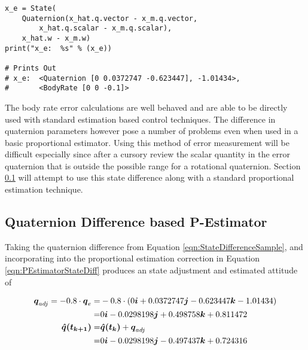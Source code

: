 \begin{singlespace}
  \begin{verbatim}
x_e = State(
    Quaternion(x_hat.q.vector - x_m.q.vector,
        x_hat.q.scalar - x_m.q.scalar),
    x_hat.w - x_m.w)
print("x_e:  %s" % (x_e))

# Prints Out
# x_e:  <Quaternion [0 0.0372747 -0.623447], -1.01434>,
#       <BodyRate [0 0 -0.1]>
  \end{verbatim}
\nocite{minted}
\end{singlespace}


The body rate error calculations are well behaved and are able to be directly used with standard estimation based control techniques.  The difference in quaternion parameters however pose a number of problems even when used in a basic proportional estimator.  Using this method of error measurement will be difficult especially since after a cursory review the scalar quantity in the error quaternion that is outside the possible range for a rotational quaternion.  Section \ref{subsec:QuaternionDifferencebasedPEstimator} will attempt to use this state difference along with a standard proportional estimation technique.

\subsection{Quaternion Difference based P-Estimator}
\label{subsec:QuaternionDifferencebasedPEstimator}

Taking the quaternion difference from Equation \ref{eqn:StateDifferenceSample}, and incorporating into the proportional estimation correction in Equation \ref{eqn:PEstimatorStateDiff} produces an state adjustment and estimated attitude of

\begin{equation}
  \begin{aligned}
    \boldsymbol{q}_{adj} = -0.8 \cdot \boldsymbol{q}_e =& -0.8 \cdot (0 \boldsymbol{i} + 0.0372747 \boldsymbol{j} -0.623447 \boldsymbol{k} -1.01434 ) \\
                       =& 0 \boldsymbol{i} -0.0298198 \boldsymbol{j} +0.498758 \boldsymbol{k} +0.811472 \\
    \boldsymbol{\hat{q}(t_{k+1})} =& \boldsymbol{\hat{q}(t_{k})} + \boldsymbol{q}_{adj} \\
                       =& 0 \boldsymbol{i} -0.0298198 \boldsymbol{j} -0.497437 \boldsymbol{k} + 0.724316 \\
  \end{aligned}
\end{equation}

